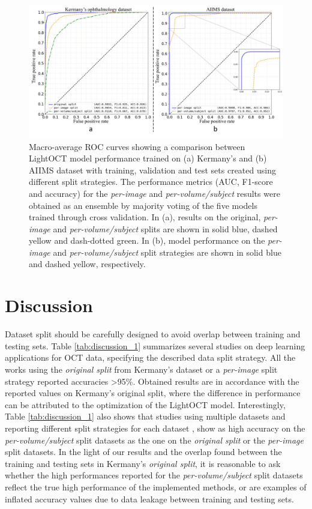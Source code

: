 \documentclass[fleqn,10pt]{wlscirep}
\begin{document}
\begin{figure}[t]
\centering
\includegraphics[width=450pt]{dataset_paper_ROC.pdf}
\caption{Macro-average ROC curves showing a comparison between LightOCT model performance trained on (a) Kermany’s \cite{kermany2018large} and (b) AIIMS \cite{butola2019volumetric} dataset with training, validation and test sets created using different split strategies. The performance metrics (AUC, F1-score and accuracy) for the \textit{per-image} and \textit{per-volume/subject} results were obtained as an ensemble by majority voting of the five models trained through cross validation. In (a), results on the original, \textit{per-image} and \textit{per-volume/subject} splits are shown in solid blue, dashed yellow and dash-dotted green. In (b), model performance on the \textit{per-image} and \textit{per-volume/subject} split strategies are shown in solid blue and dashed yellow, respectively.}
\label{fig:results_1}
\end{figure}

\section*{Discussion}
Dataset split should be carefully designed to avoid overlap between training and testing sets. Table \ref{tab:discussion_1} summarizes several studies on deep learning applications for OCT data, specifying the described data split strategy. All the works using the \textit{original split} from Kermany’s dataset or a \textit{per-image} split strategy reported accuracies >95\%. Obtained results are in accordance with the reported values on Kermany’s original split, where the difference in performance can be attributed to the optimization of the LightOCT model. Interestingly, Table \ref{tab:discussion_1} also shows that studies using multiple datasets and reporting different split strategies for each dataset \cite{butola2020deep,kamran2019optic, thomas2021novel}, show as high accuracy on the \mbox{\textit{per-volume/subject}} split datasets as the one on the \textit{original split} or the \textit{per-image} split datasets. In the light of our results and the overlap found between the training and testing sets in Kermany’s \textit{original split}, it is reasonable to ask whether the high performances reported for the \textit{per-volume/subject} split datasets reflect the true high performance of the implemented methods, or are examples of inflated accuracy values due to data leakage between training and testing sets.
\end{document}
